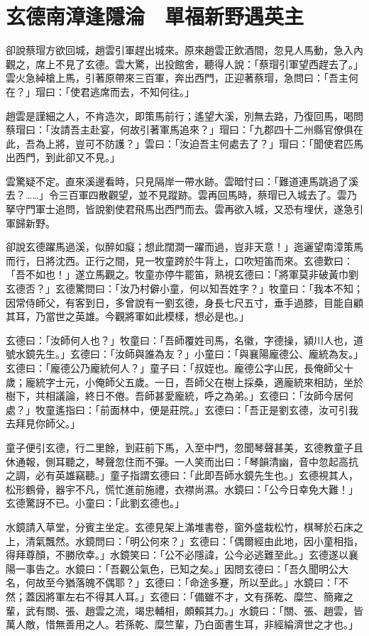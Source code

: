 
\chapter{玄德南漳逢隱淪　單福新野遇英主}

卻說蔡瑁方欲回城，趙雲引軍趕出城來。原來趙雲正飲酒間，忽見人馬動，急入內觀之，席上不見了玄德。雲大驚，出投館舍，聽得人說：「蔡瑁引軍望西趕去了。」雲火急綽槍上馬，引著原帶來三百軍，奔出西門，正迎著蔡瑁，急問曰：「吾主何在？」瑁曰：「使君逃席而去，不知何往。」

趙雲是謹細之人，不肯造次，即策馬前行；遙望大溪，別無去路，乃復回馬，喝問蔡瑁曰：「汝請吾主赴宴，何故引著軍馬追來？」瑁曰：「九郡四十二州縣官僚俱在此，吾為上將，豈可不防護？」雲曰：「汝迫吾主何處去了？」瑁曰：「聞使君匹馬出西門，到此卻又不見。」

雲驚疑不定。直來溪邊看時，只見隔岸一帶水跡。雲暗忖曰：「難道連馬跳過了溪去？……」令三百軍四散觀望，並不見蹤跡。雲再回馬時，蔡瑁已入城去了。雲乃拏守門軍士追問，皆說劉使君飛馬出西門而去。雲再欲入城，又恐有埋伏，遂急引軍歸新野。

卻說玄德躍馬過溪，似醉如癡；想此闊澗一躍而過，豈非天意！」迤邐望南漳策馬而行，日將沈西。正行之間，見一牧童跨於牛背上，口吹短笛而來。玄德歎曰：「吾不如也！」遂立馬觀之。牧童亦停牛罷笛，熟視玄德曰：「將軍莫非破黃巾劉玄德否？」玄德驚問曰：「汝乃村僻小童，何以知吾姓字？」牧童曰：「我本不知；因常侍師父，有客到日，多曾說有一劉玄德，身長七尺五寸，垂手過膝，目能自顧其耳，乃當世之英雄。今觀將軍如此模樣，想必是也。」

玄德曰：「汝師何人也？」牧童曰：「吾師覆姓司馬，名徽，字德操，潁川人也，道號水鏡先生。」玄德曰：「汝師與誰為友？」小童曰：「與襄陽龐德公、龐統為友。」玄德曰：「龐德公乃龐統何人？」童子曰：「叔姪也。龐德公字山民，長俺師父十歲；龐統字士元，小俺師父五歲。一日，吾師父在樹上採桑，適龐統來相訪，坐於樹下，共相議論，終日不倦。吾師甚愛龐統，呼之為弟。」玄德曰：「汝師今居何處？」牧童遙指曰：「前面林中，便是莊院。」玄德曰：「吾正是劉玄德，汝可引我去拜見你師父。」

童子便引玄德，行二里餘，到莊前下馬，入至中門，忽聞琴聲甚美，玄德教童子且休通報，側耳聽之，琴聲忽住而不彈。一人笑而出曰：「琴韻清幽，音中忽起高抗之調，必有英雄竊聽。」童子指謂玄德曰：「此即吾師水鏡先生也。」玄德視其人，松形鶴骨，器宇不凡，慌忙進前施禮，衣襟尚濕。水鏡曰：「公今日幸免大難！」玄德驚訝不已。小童曰：「此劉玄德也。」

水鏡請入草堂，分賓主坐定。玄德見架上滿堆書卷，窗外盛栽松竹，棋琴於石床之上，清氣飄然。水鏡問曰：「明公何來？」玄德曰：「偶爾經由此地，因小童相指，得拜尊顏，不勝欣幸。」水鏡笑曰：「公不必隱諱，公今必逃難至此。」玄德遂以襄陽一事告之。水鏡曰：「吾觀公氣色，已知之矣。」因問玄德曰：「吾久聞明公大名，何故至今猶落魄不偶耶？」玄德曰：「命途多蹇，所以至此。」水鏡曰：「不然；蓋因將軍左右不得其人耳。」玄德曰：「備雖不才，文有孫乾、糜竺、簡雍之輩，武有關、張、趙雲之流，竭忠輔相，頗賴其力。」水鏡曰：「關、張、趙雲，皆萬人敵，惜無善用之人。若孫乾、糜竺輩，乃白面書生耳，非經綸濟世之才也。」

